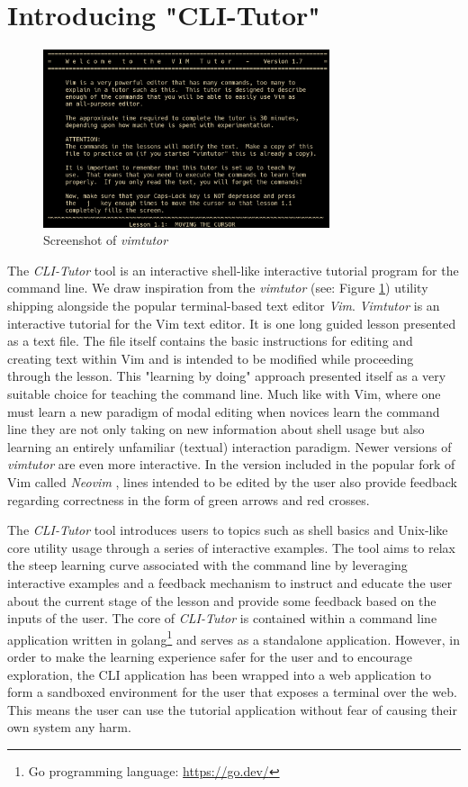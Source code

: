 \section{Introducing "CLI-Tutor"}
\begin{figure}[htbp]
	\centering
	\includegraphics[width=0.75\textwidth]{img/vimtutor}
	\caption{Screenshot of \textit{vimtutor}}
	\label{fig:vimtutor}
\end{figure}

The \textit{CLI-Tutor} tool is an interactive shell-like interactive tutorial program for
the command line. We draw inspiration from the
\textit{vimtutor}\cite{pierce_ware_smith_moolenaar_2019} (see: Figure
\ref{fig:vimtutor}) utility shipping alongside the popular terminal-based text
editor \textit{Vim}. \textit{Vimtutor} is an interactive tutorial for the Vim text
editor. It is one long guided lesson presented as a text file. The file itself
contains the basic instructions for editing and creating text within Vim and is
intended to be modified while proceeding through the lesson. This "learning by
doing" approach presented itself as a very suitable choice for teaching the
command line. Much like with Vim, where one must learn a new paradigm of modal
editing when novices learn the command line they are not only taking on new
information about shell usage but also learning an entirely unfamiliar
(textual) interaction paradigm. Newer versions of \textit{vimtutor} are even more
interactive. In the version included in the popular fork of Vim called \textit{Neovim}
\cite{neovimHomeNeovim}, lines intended to be edited by the user also provide
feedback regarding correctness in the form of green arrows and red crosses.

The \textit{CLI-Tutor} tool introduces users to topics such as shell basics and
Unix-like core utility usage through a series of interactive examples. The tool
aims to relax the steep learning curve associated with the command line by
leveraging interactive examples and a feedback mechanism to instruct and
educate the user about the current stage of the lesson and provide some
feedback based on the inputs of the user. The core of \textit{CLI-Tutor} is
contained within a command line application written in golang\footnote{Go
	programming language: \href{https://go.dev/}{https://go.dev/}} and serves as a
standalone application. However, in order to make the learning experience safer
for the user and to encourage exploration, the CLI application has been wrapped
into a web application to form a sandboxed environment for the user that
exposes a terminal over the web. This means the user can use the tutorial
application without fear of causing their own system any harm.

